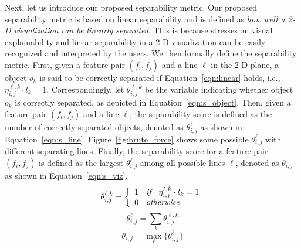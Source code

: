 Next, let us introduce our proposed separability metric. Our proposed separability metric is based on linear separability and is defined as {\em how well a 2-D visualization can be linearly separated}. This is because \genviz stresses on visual explainability and linear separability in a 2-D visualization can be easily recognized and interpreted by the users. We then formally define the separability metric.
First, given a feature pair $(f_i, f_j)$ and a line $\ell$ in the 2-D plane, a object $o_k$ is said to be correctly separated if Equation~\ref{eqn:linear} holds, i.e., $\eta_{i,j}^{\ell,k}\cdot l_k = 1$. Correspondingly, let $\theta_{i,j}^{\ell,k}$ be the variable indicating whether object $o_k$ is correctly separated, as depicted in Equation~\ref{eqn:s_object}. Then, given a feature pair $(f_i, f_j)$ and a line $\ell$, the separability score is defined as the number of correctly separated objects, denoted as $\theta_{i, j}^\ell$ as shown in Equation~\ref{eqn:s_line}. Figure~\ref{fig:brute_force} shows some possible $\theta_{i, j}^\ell$ with different separating lines. Finally, the separability score for a feature pair $(f_i,f_j)$ is defined as the largest $\theta_{i, j}^{\ell}$ among all possible lines $\ell$, denoted as $\theta_{i, j}$ as shown in Equation~\ref{eqn:s_viz}. 
\begin{equation}\label{eqn:s_object}
\theta_{i,j}^{\ell,k}=\left\{
                \begin{array}{ll}
                  1 \textit{\hspace{2mm} if \hspace{2mm}} \eta_{i,j}^{\ell,k}\cdot l_k = 1\\
                  0 \textit{\hspace{2mm} otherwise \hspace{2mm}} 
                \end{array}
              \right.
\end{equation}
\begin{equation}\label{eqn:s_line}
\theta_{i,j}^{\ell}= \sum_{k}{\theta_{i,j}^{\ell,k}}
\end{equation}
\begin{equation}\label{eqn:s_viz}
\theta_{i,j}= \max_{\ell}\{\theta_{i,j}^{\ell}\}
\end{equation}


